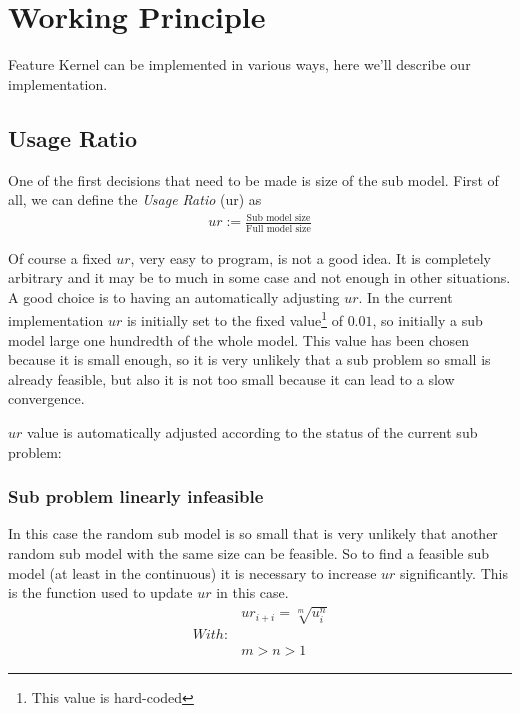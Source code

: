 \section{Working Principle}

Feature Kernel can be implemented in various ways, here we'll describe our implementation. 

\subsection{Usage Ratio} \label{sec:usage-ratio}
One of the first decisions that need to be made is size of the sub model.
First of all, we can define the \emph{Usage Ratio} (ur) as 
\begin{align}
    ur := \frac{\text{Sub model size}}{\text{Full model size}} \label{eq:usage-ratio}
\end{align}

Of course a fixed $ur$, very easy to program, is not a good idea. 
It is completely arbitrary and it may be to much in some case and not enough in other situations. 
A good choice is to having an automatically adjusting $ur$. In the current implementation $ur$ is initially set to the fixed value\footnote{This value is hard-coded} of $0.01$, so initially
a sub model large one hundredth of the whole model. This value has been chosen because it is small enough, so it is very unlikely that a sub problem so small
is already feasible, but also it is not too small because it can lead to a slow convergence. 


$ur$ value is automatically adjusted according to the status of the current sub problem:


\subsubsection*{Sub problem linearly infeasible}\label{subsec:lin-infeasible-action}

    In this case the random sub model is so small that is very unlikely that another random sub model
    with the same size can be feasible. So to find a feasible sub model (at least in the continuous) 
    it is necessary to increase $ur$ significantly. This is the function used to update $ur$ in this case. 
    \begin{align}
        &ur_{i+i} = \sqrt[m]{u_{i}^{n}}\label{eq:ur-infease-grow} \\
        With:&\nonumber \\
        &m > n > 1 \nonumber
    \end{align}

